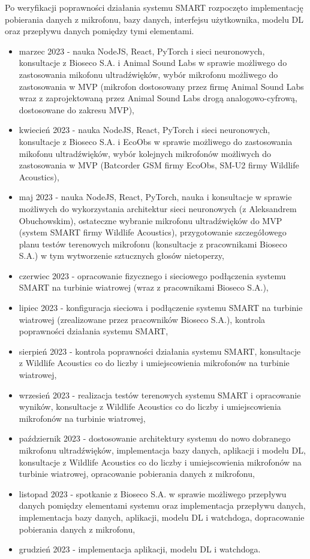 \documentclass{sprz}
\begin{document}
Po weryfikacji poprawności działania systemu SMART rozpoczęto implementację pobierania danych z mikrofonu, bazy danych, interfejsu użytkownika, modelu DL oraz przepływu danych pomiędzy tymi elementami.

\begin{itemize}
  \item{marzec 2023 - nauka NodeJS, React, PyTorch i sieci neuronowych, konsultacje z Bioseco S.A. i Animal Sound Labs w sprawie możliwego do zastosowania mikofonu ultradźwięków, wybór mikrofonu możliwego do zastosowania w MVP (mikrofon dostosowany przez firmę Animal Sound Labs wraz z zaprojektowaną przez Animal Sound Labs drogą analogowo-cyfrową, dostosowane do zakresu MVP),}
  \item{kwiecień 2023 - nauka NodeJS, React, PyTorch i sieci neuronowych, konsultacje z Bioseco S.A. i EcoObs w sprawie możliwego do zastosowania mikofonu ultradźwięków, wybór kolejnych mikrofonów możliwych do zastosowania w MVP (Batcorder GSM firmy EcoObs, SM-U2 firmy Wildlife Acoustics),}
  \item{maj 2023 - nauka NodeJS, React, PyTorch, nauka i konsultacje w sprawie możliwych do wykorzystania architektur sieci neuronowych (z Aleksandrem Obuchowskim), ostateczne wybranie mikrofonu ultradźwięków do MVP (system SMART firmy Wildlife Acoustics), przygotowanie szczegółowego planu testów terenowych mikrofonu (konsultacje z pracownikami Bioseco S.A.) w tym wytworzenie sztucznych głosów nietoperzy,}
  \item{czerwiec 2023 - opracowanie fizycznego i sieciowego podłączenia systemu SMART na turbinie wiatrowej (wraz z pracownikami Bioseco S.A.),}
  \item{lipiec 2023 - konfiguracja sieciowa i podłączenie systemu SMART na turbinie wiatrowej (zrealizowane przez pracowników Bioseco S.A.), kontrola poprawności działania systemu SMART,}
  \item{sierpień 2023 - kontrola poprawności działania systemu SMART, konsultacje z Wildlife Acoustics co do liczby i umiejscowienia mikrofonów na turbinie wiatrowej,}
  \item{wrzesień 2023 - realizacja testów terenowych systemu SMART i opracowanie wyników, konsultacje z Wildlife Acoustics co do liczby i umiejscowienia mikrofonów na turbinie wiatrowej,}
  \item{październik 2023 - dostosowanie architektury systemu do nowo dobranego mikrofonu ultradźwięków, implementacja bazy danych, aplikacji i modelu DL, konsultacje z Wildlife Acoustics co do liczby i umiejscowienia mikrofonów na turbinie wiatrowej, opracowanie pobierania danych z mikrofonu,}
  \item {listopad 2023 - spotkanie z Bioseco S.A. w sprawie możliwego przepływu danych pomiędzy elementami systemu oraz implementacja przepływu danych, implementacja bazy danych, aplikacji, modelu DL i watchdoga, dopracowanie pobierania danych z mikrofonu,}
  \item {grudzień 2023 - implementacja aplikacji, modelu DL i watchdoga.}
  \end{itemize}
\end{document}
